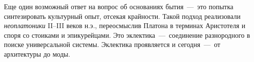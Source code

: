 
Еще один возможный ответ на вопрос об основаниях бытия~---~это попытка синтезировать культурный опыт, отсекая крайности. Такой подход реализовали \textit{неоплатоники} II–III веков н.э., переосмыслив Платона в терминах Аристотеля и споря со стоиками и эпикурейцами. Это эклектика~---~соединение разнородного в поиске универсальной системы. Эклектика проявляется и сегодня~---~от архитектуры до моды.

